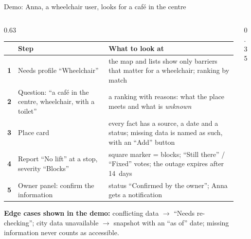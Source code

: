 \begin{frame}{Demo: Anna, a wheelchair user, looks for a café in the centre}
  \begin{columns}[T,onlytextwidth]
    \begin{column}{0.63\textwidth}
      \scriptsize
      \renewcommand{\arraystretch}{1.1}
      \begin{tabularx}{\textwidth}{@{}>{\bfseries\color{accNavy}}c >{\raggedright\arraybackslash}p{30mm} >{\raggedright\arraybackslash}X@{}}
        \toprule
        & \textbf{Step} & \textbf{What to look at} \\
        \midrule
        1 & Needs profile “Wheelchair” &
            the map and lists show only barriers that matter for a wheelchair; ranking by match \\
        2 & Question: “a café in the centre, wheelchair, with a toilet” &
            a ranking with reasons: what the place meets and what is \emph{unknown} \\
        3 & Place card &
            every fact has a source, a date and a status; missing data is named as such, with an “Add” button \\
        4 & Report “No lift” at a stop, severity “Blocks” &
            square marker = blocks; “Still there” / “Fixed” votes; the outage expires after 14~days \\
        5 & Owner panel: confirm the information &
            status “Confirmed by the owner”; Anna gets a notification \\
        \bottomrule
      \end{tabularx}

      \vspace{1.5mm}
      \textbf{Edge cases shown in the demo:} conflicting data $\rightarrow$ “Needs re-checking”;
      city data unavailable $\rightarrow$ snapshot with an “as of” date; missing information never counts as accessible.

      \vspace{1mm}
    \end{column}
    \begin{column}{0.35\textwidth}
      \par
      \vspace{0.3mm}
      \vspace{1.5mm}
      \par
      \vspace{0.3mm}
    \end{column}
  \end{columns}


\end{frame}
